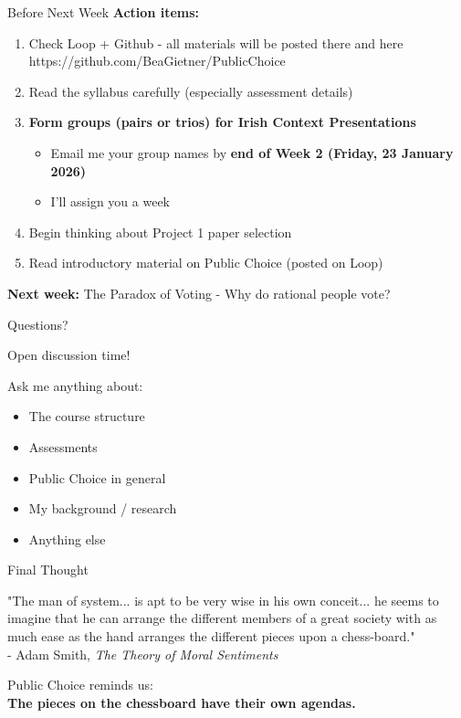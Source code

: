 \documentclass[10pt]{beamer}
\begin{document}
\begin{frame}{Before Next Week}
\textbf{Action items:}
\begin{enumerate}
\item Check Loop + Github - all materials will be posted there and here https://github.com/BeaGietner/PublicChoice
\item Read the syllabus carefully (especially assessment details)
\item \textbf{Form groups (pairs or trios) for Irish Context Presentations}
\begin{itemize}
\item Email me your group names by \textbf{end of Week 2 (Friday, 23 January 2026)}
\item I'll assign you a week
\end{itemize}
\item Begin thinking about Project 1 paper selection
\item Read introductory material on Public Choice (posted on Loop)
\end{enumerate}

\vspace{0.5cm}
\textbf{Next week:} The Paradox of Voting - Why do rational people vote?
\end{frame}

\begin{frame}{Questions?}
\begin{center}
\Large Open discussion time!

\vspace{1cm}
Ask me anything about:
\begin{itemize}
\item The course structure
\item Assessments
\item Public Choice in general
\item My background / research
\item Anything else
\end{itemize}
\end{center}
\end{frame}

\begin{frame}{Final Thought}
\begin{center}
\large "The man of system... is apt to be very wise in his own conceit... he seems to imagine that he can arrange the different members of a great society with as much ease as the hand arranges the different pieces upon a chess-board." \\
\vspace{0.5cm}
- Adam Smith, \textit{The Theory of Moral Sentiments}
\end{center}

\vspace{0.5cm}
\pause
\begin{center}
Public Choice reminds us: \\
\textbf{The pieces on the chessboard have their own agendas.}
\end{center}
\end{frame}
\end{document}
